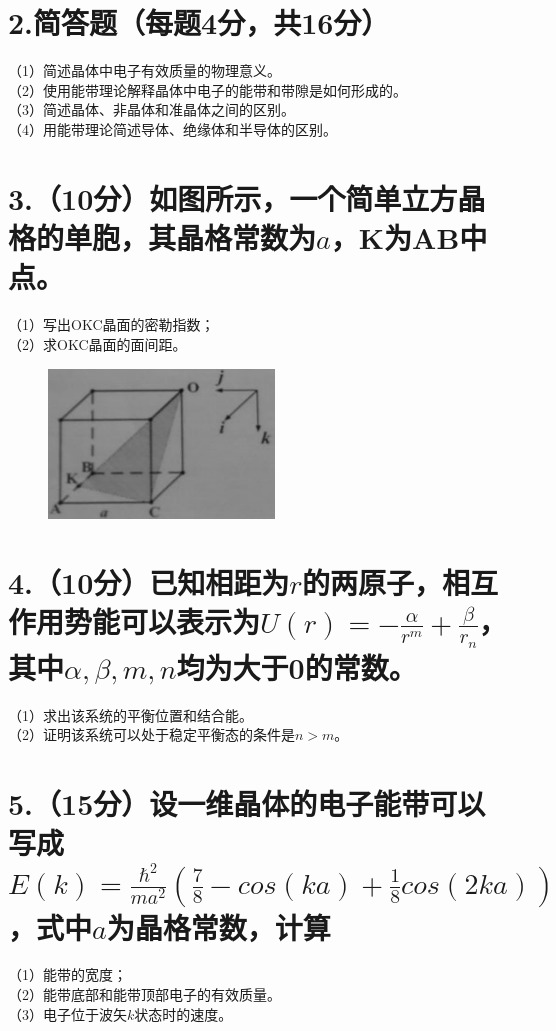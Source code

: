 \documentclass[UTF8]{ctexart}
\begin{document}
\section*{\bfseries 2.简答题（每题4分，共16分）}
（1）简述晶体中电子有效质量的物理意义。\\
（2）使用能带理论解释晶体中电子的能带和带隙是如何形成的。\\
（3）简述晶体、非晶体和准晶体之间的区别。\\
（4）用能带理论简述导体、绝缘体和半导体的区别。\\
\section*{\bfseries 3.（10分）如图所示，一个简单立方晶格的单胞，其晶格常数为$a$，K为AB中点。}
（1）写出OKC晶面的密勒指数；\\
（2）求OKC晶面的面间距。\\
\begin{figure}[H]
    \centering
    \includegraphics[width=6cm,height=4cm]{3.png}
\end{figure}
\section*{\bfseries 4.（10分）已知相距为$r$的两原子，相互作用势能可以表示为$U(r)=-\frac{\alpha}{r^m}+
\frac{\beta}{r_n}$，其中$\alpha,\beta,m,n$均为大于0的常数。}
（1）求出该系统的平衡位置和结合能。\\
（2）证明该系统可以处于稳定平衡态的条件是$n>m$。\\
\section*{\bfseries 5.（15分）设一维晶体的电子能带可以写成$E(k)=\frac{\hbar^2}{ma^2}(\frac{7}{8}-cos(ka)
+\frac{1}{8}cos(2ka))$，式中$a$为晶格常数，计算}
（1）能带的宽度；\\
（2）能带底部和能带顶部电子的有效质量。\\
（3）电子位于波矢$k$状态时的速度。\\
\end{document}
